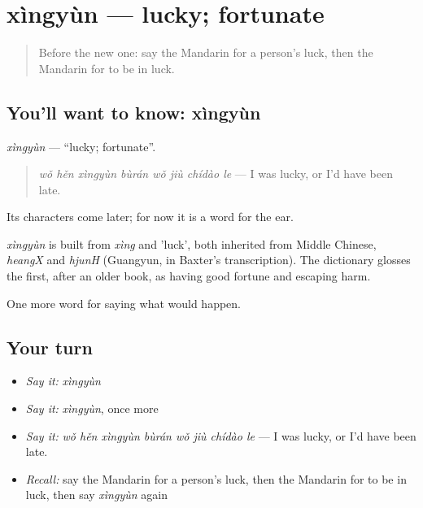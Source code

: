 \section[xìngyùn]{xìngyùn — lucky; fortunate}

\label{lesson:ZH-C529-xingyun}



\begin{quote}
Before the new one: say the Mandarin for a person's luck, then the Mandarin for to be in luck.
\end{quote}

\subsection*{You'll want to know: xìngyùn}
\emph{xìngyùn} — \textquotedblleft{}lucky; fortunate\textquotedblright{}.

\begin{quote}
\emph{wǒ hěn xìngyùn bùrán wǒ jiù chídào le} — I was lucky, or I'd have been late.
\end{quote}

Its characters come later; for now it is a word for the ear.

\begin{cousinweb}
\emph{xìngyùn} is built from \emph{xìng} and  'luck', both inherited from Middle Chinese, \emph{heangX} and \emph{hjunH} (Guangyun, in Baxter's transcription). The dictionary glosses the first, after an older book, as having good fortune and escaping harm.
\end{cousinweb}

\begin{grammarlens}[title={What you've built}]
One more word for saying what would happen.
\end{grammarlens}

\subsection*{Your turn}
\begin{itemize}
\raggedright
  \item \emph{Say it:} \emph{xìngyùn}
  \item \emph{Say it:} \emph{xìngyùn}, once more
  \item \emph{Say it:} \emph{wǒ hěn xìngyùn bùrán wǒ jiù chídào le} — I was lucky, or I'd have been late.
  \item \emph{Recall:} say the Mandarin for a person's luck, then the Mandarin for to be in luck, then say \emph{xìngyùn} again
\end{itemize}


